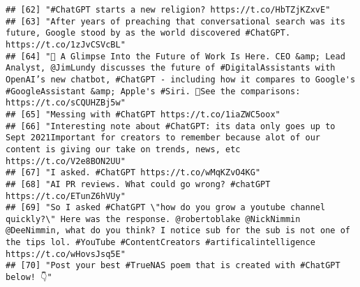 \documentclass[
]{article}
\begin{document}
\begin{verbatim}
## [62] "#ChatGPT starts a new religion? https://t.co/HbTZjKZxvE"                                                                                                                                                                                                                                                       
## [63] "After years of preaching that conversational search was its future, Google stood by as the world discovered #ChatGPT. https://t.co/1zJvCSVcBL"                                                                                                                                                                 
## [64] "👀 A Glimpse Into the Future of Work Is Here. CEO &amp; Lead Analyst, @JimLundy discusses the future of #DigitalAssistants with OpenAI’s new chatbot, #ChatGPT - including how it compares to Google's #GoogleAssistant &amp; Apple's #Siri. 🤖See the comparisons: https://t.co/sCQUHZBj5w"                   
## [65] "Messing with #ChatGPT https://t.co/1iaZWC5oox"                                                                                                                                                                                                                                                                 
## [66] "Interesting note about #ChatGPT: its data only goes up to Sept 2021Important for creators to remember because alot of our content is giving our take on trends, news, etc https://t.co/V2e8BON2UU"                                                                                                             
## [67] "I asked. #ChatGPT https://t.co/wMqKZvO4KG"                                                                                                                                                                                                                                                                     
## [68] "AI PR reviews. What could go wrong? #chatGPT https://t.co/ETunZ6hVUy"                                                                                                                                                                                                                                          
## [69] "So I asked #ChatGPT \"how do you grow a youtube channel quickly?\" Here was the response. @robertoblake @NickNimmin @DeeNimmin, what do you think? I notice sub for the sub is not one of the tips lol. #YouTube #ContentCreators #artificalintelligence https://t.co/wHovsJsq5E"                              
## [70] "Post your best #TrueNAS poem that is created with #ChatGPT below! 👇"                                                                                                                                                                                                                                          

\end{verbatim}
\end{document}
